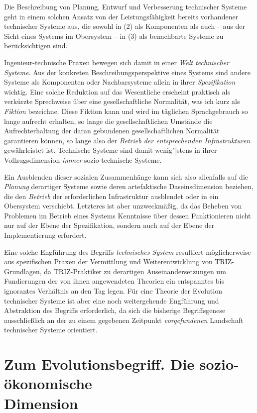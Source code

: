 \documentclass[12pt,a4paper]{article}
\begin{document}
Die Beschreibung von Planung, Entwurf und Verbesserung technischer Systeme
geht in einem solchen Ansatz von der Leistungsfähigkeit bereits vorhandener
technischer Systeme aus, die sowohl in (2) als Komponenten als auch -- aus der
Sicht eines Systems im Obersystem -- in (3) als benachbarte Systeme zu
berücksichtigen sind.

Ingenieur-technische Praxen bewegen sich damit in einer \emph{Welt technischer
  Systeme}. Aus der konkreten Beschreibungsperspektive eines Systems sind
andere Systeme als Komponenten oder Nachbarsysteme allein in ihrer
\emph{Spezifikation} wichtig. Eine solche Reduktion auf das Wesentliche
erscheint praktisch als verkürzte Sprechweise über eine gesellschaftliche
Normalität, was ich kurz als \emph{Fiktion} bezeichne.  Diese Fiktion kann und
wird im täglichen Sprachgebrauch so lange aufrecht erhalten, so lange die
gesellschaftlichen Umstände die Aufrechterhaltung der daran gebundenen
gesellschaftlichen Normalität garantieren können, so lange also der
\emph{Betrieb der entsprechenden Infrastrukturen} gewährleistet ist.
Technische Systeme sind damit wenig"|stens in ihrer Vollzugsdimension
\emph{immer} sozio-technische Systeme.

Ein Ausblenden dieser sozialen Zusammenhänge kann sich also allenfalls auf die
\emph{Planung} derartiger Systeme sowie deren artefaktische Daseinsdimension
beziehen, die den \emph{Betrieb} der erforderlichen Infrastruktur ausblendet
oder in ein Obersystem verschiebt.  Letzteres ist aber unzweckmäßig, da das
Beheben von Problemen im Betrieb eines Systems Kenntnisse über dessen
Funktionieren nicht nur auf der Ebene der Spezifikation, sondern auch auf der
Ebene der Implementierung erfordert.

Eine solche Engführung des Begriffs \emph{technisches System} resultiert
möglicherweise aus spezifischen Praxen der Vermittlung und Weiterentwicklung
von TRIZ-Grundlagen, da TRIZ-Praktiker zu derartigen Auseinandersetzungen um
Fundierungen der von ihnen angewendeten Theorien ein entspanntes bis
ignorantes Verhältnis an den Tag legen. Für eine Theorie der Evolution
technischer Systeme ist aber eine noch weitergehende Engführung und
Abstraktion des Begriffs erforderlich, da sich die bisherige Begriffsgenese
ausschließlich an der zu einem gegebenen Zeitpunkt \emph{vorgefundenen}
Landschaft technischer Systeme orientiert.

\section{Zum Evolutionsbegriff. Die sozio-ökonomische\\ Dimension} 
\end{document}
